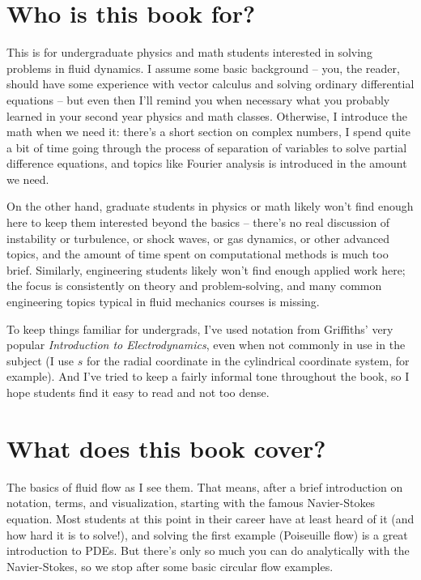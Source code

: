 \documentclass[10pt, a5paper, twoside, openany]{memoir}
\newcounter{example}[chapter]
\newcounter{problem}[chapter]
\begin{document}
\section{Who is this book for?}

This is for undergraduate physics and math students interested in solving problems in fluid dynamics.  I assume some basic background -- you, the reader, should have some experience with vector calculus and solving ordinary differential equations -- but even then I'll remind you when necessary what you probably learned in your second year physics and math classes.  Otherwise, I introduce the math when we need it: there's a short section on complex numbers, I spend quite a bit of time going through the process of separation of variables to solve partial difference equations, and topics like Fourier analysis is introduced in the amount we need.

On the other hand, graduate students in physics or math likely won't find enough here to keep them interested beyond the basics -- there's no real discussion of instability or turbulence, or shock waves, or gas dynamics, or other advanced topics, and the amount of time spent on computational methods is much too brief.  Similarly, engineering students likely won't find enough applied work here; the focus is consistently on theory and problem-solving, and many common engineering topics typical in fluid mechanics courses is missing.

To keep things familiar for undergrads, I've used notation from Griffiths' very popular \emph{Introduction to Electrodynamics}, even when not commonly in use in the subject (I use $s$ for the radial coordinate in the cylindrical coordinate system, for example). And I've tried to keep a fairly informal tone throughout the book, so I hope students find it easy to read and not too dense.

\section{What does this book cover?}

The basics of fluid flow as I see them.  That means, after a brief introduction on notation, terms, and visualization, starting with the famous Navier-Stokes equation.  Most students at this point in their career have at least heard of it (and how hard it is to solve!), and solving the first example (Poiseuille flow) is a great introduction to PDEs.  But there's only so much you can do analytically with the Navier-Stokes, so we stop after some basic circular flow examples.  
\end{document}
